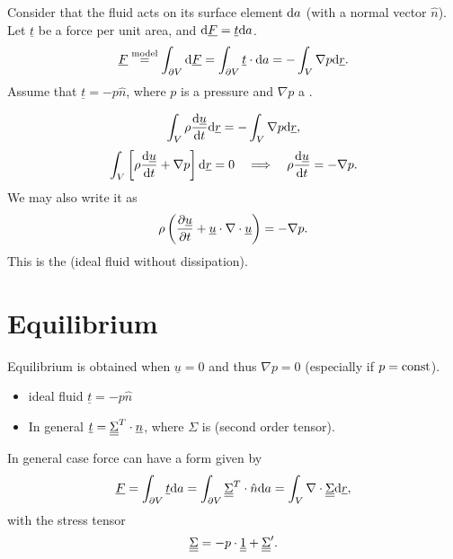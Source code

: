\documentclass[11pt,oneside]{book}
\renewcommand{\vec}[1]{\underline{#1}}
\theoremstyle{definition} %
\theoremstyle{plain} %
\theoremstyle{remark} %
\theoremstyle{underline}
\begin{document}
  \begin{figure}[h]
    \centering
  \end{figure}

  Consider that the fluid acts on its surface element $\mathrm{d} a$ (with a normal vector $\hat n$).
  Let $\vec t$ be a force per unit area, and $\d \vec F = \vec t \d a$.
  \begin{displaymath}
    \vec F \os{\tm{model}}{=} \int_{\partial V} \d \vec F 
    = \int_{\partial V}  \vec t \cdot \d a
    = - \int_V \nabla p \d \vec r.
  \end{displaymath}
  Assume that $\vec t = - p \hat{n}$, where $p $ is a pressure and $\nabla p $ a .
  
  \begin{displaymath}
    \int_V \rho \dfrac{\vec u }{t} \d \vec r = - \int_V \nabla p \d \vec r,
  \end{displaymath}
  \begin{displaymath}
    \int_V \left[ \rho \dfrac{\vec u}{t} + \nabla p \right]\d \vec r = 0 
    \qLRa \rho \dfrac{ \vec u }{t} = - \nabla p.
  \end{displaymath}
  We may also write it as 
  \begin{displaymath}
    \rho \left( \ptf{\vec u}{t} + \vec u \cdot \nabla \cdot \vec u  \right) = - \nabla p.
  \end{displaymath}
  This is the  (ideal fluid without dissipation).
  
  \section{Equilibrium}
  Equilibrium is obtained when $\vec u = 0$ and thus $\nabla p = 0$
  (especially if $p = \textrm{const}$).
  \begin{itemize}
    \item ideal fluid $ \vec t = - p \hat n$
    \item In general $ \vec t = \ten{\Sigma}^T \cdot \vec n$, where $\Sigma$ is  (second order tensor).
  \end{itemize}
  In general case force can have a form given by
  \begin{displaymath}
    \vec F = \int_{\partial V} \vec t \d a = \int_{\partial V} \ten{\Sigma}^T \cdot \hat n \d a 
    = \int_V \nabla \cdot \ten{\Sigma} \d \vec r,
  \end{displaymath}
  with the stress tensor
  \begin{displaymath}
    \ten{\Sigma} = - p \cdot\ten{1} + \ten{\Sigma}'. %
  \end{displaymath}
\end{document}
